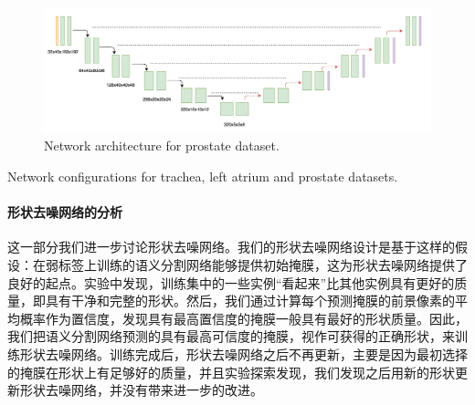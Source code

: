     \begin{figure}[tbp]
        \centering 
        \includegraphics[width=1.0\textwidth]{img/c3/s_net3.png}
        {Network architecture for prostate dataset.}
        \label{fig:s_net2}
    \end{figure}

    \begin{table}[t!]
	\centering
    {Network configurations for trachea, left atrium and prostate datasets.}
	\label{tab:net_params}        
\end{table}


\paragraph{形状去噪网络的分析}
这一部分我们进一步讨论形状去噪网络。我们的形状去噪网络设计是基于这样的假设：在弱标签上训练的语义分割网络能够提供初始掩膜，这为形状去噪网络提供了良好的起点。实验中发现，训练集中的一些实例“看起来”比其他实例具有更好的质量，即具有干净和完整的形状。然后，我们通过计算每个预测掩膜的前景像素的平均概率作为置信度，发现具有最高置信度的掩膜一般具有最好的形状质量。因此，我们把语义分割网络预测的具有最高可信度的掩膜，视作可获得的正确形状，来训练形状去噪网络。训练完成后，形状去噪网络之后不再更新，主要是因为最初选择的掩膜在形状上有足够好的质量，并且实验探索发现，我们发现之后用新的形状更新形状去噪网络，并没有带来进一步的改进。

